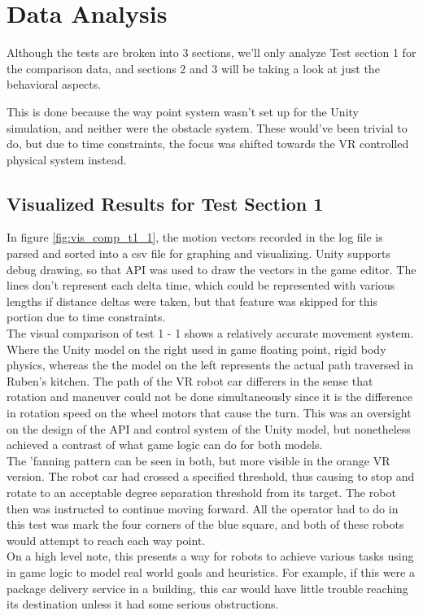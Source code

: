 \documentclass[10pt,a4paper]{article}
\begin{document}
	
	\section*{Data Analysis}
	Although the tests are broken into 3 sections, we'll only analyze Test section 1 for the comparison data, and sections 2 and 3 will be taking a look at just the behavioral aspects.
	
	This is done because the way point system wasn't set up for the Unity simulation, and neither were the obstacle system. These would've been trivial to do, but due to time constraints, the focus was shifted towards the VR controlled physical system instead.
	
	\subsection*{Visualized Results for Test Section 1}
	In figure \ref{fig:vis_comp_t1_1}, the motion vectors recorded in the log file is parsed and sorted into a csv file for graphing and visualizing. Unity supports debug drawing, so that API was used to draw the vectors in the game editor. The lines don't represent each delta time, which could be represented with various lengths if distance deltas were taken, but that feature was skipped for this portion due to time constraints.
	\\
	The visual comparison of test 1 - 1 shows a relatively accurate movement system. Where the Unity model on the right used in game floating point, rigid body physics, whereas the the model on the left represents the actual path traversed in Ruben's kitchen. The path of the VR robot car differers in the sense that rotation and maneuver could not be done simultaneously since it is the difference in rotation speed on the wheel motors that cause the turn. This was an oversight on the design of the API and control system of the Unity model, but nonetheless achieved a contrast of what game logic can do for both models.
	\\
	The 'fanning pattern can be seen in both, but more visible in the orange VR version. The robot car had crossed a specified threshold, thus causing to stop and rotate to an acceptable degree separation threshold from its target. The robot then was instructed to continue moving forward. All the operator had to do in this test was mark the four corners of the blue square, and both of these robots would attempt to reach each way point.
	\\
	On a high level note, this presents a way for robots to achieve various tasks using in game logic to model real world goals and heuristics. For example, if this were a package delivery service in a building, this car would have little trouble reaching its destination unless it had some serious obstructions.
\end{document}
